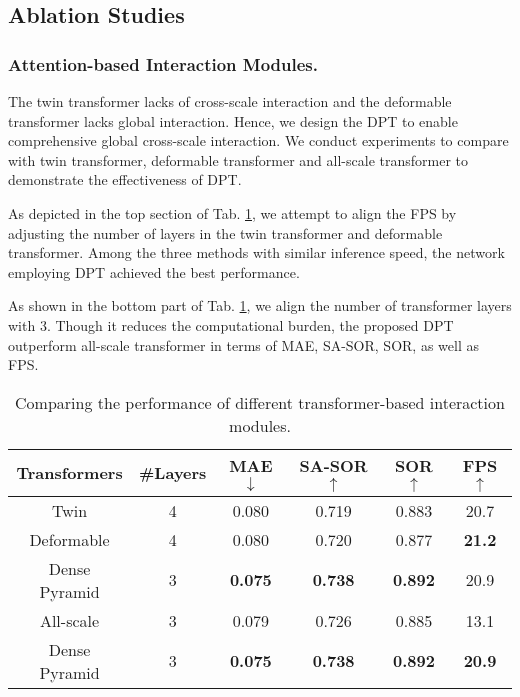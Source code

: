 \documentclass[sigconf]{acmart}
\newcommand{\tabref}[1]{Tab. \ref{#1}}
\begin{document}
\subsection{Ablation Studies}

\subsubsection{Attention-based Interaction Modules.} The twin transformer \cite{guo2021sotr} lacks of cross-scale interaction and the deformable transformer \cite{zhu2020deformable} lacks global interaction. Hence, we design the DPT to enable comprehensive global cross-scale interaction. We conduct experiments to compare with twin transformer, deformable transformer and all-scale transformer to demonstrate the effectiveness of DPT.

As depicted in the top section of \tabref{table:Ablation of attention}, we attempt to align the FPS by adjusting the number of layers in the twin transformer and deformable transformer. Among the three methods with similar inference speed, the network employing DPT achieved the best performance. 

As shown in the bottom part of \tabref{table:Ablation of attention}, we align the number of transformer layers with 3.
Though it reduces the computational burden, the proposed DPT outperform all-scale transformer in terms of MAE, SA-SOR, SOR, as well as FPS.

\begin{table}[t]
\caption{Comparing the performance of different transformer-based interaction modules.}
\label{table:Ablation of attention}
\setlength{\tabcolsep}{1.6mm}
    \begin{tabular}{c|c|c|c|c|c}
    \toprule[1pt]
    Transformers  & \#Layers & MAE$\downarrow$ & SA-SOR$\uparrow$ & SOR$\uparrow$    & FPS$\uparrow$  \\
    \hline
    Twin \cite{guo2021sotr}          & 4        & 0.080  & 0.719  & 0.883  & 20.7 \\
    Deformable \cite{zhu2020deformable}    & 4        & 0.080  & 0.720  & 0.877  & \textbf{21.2} \\
    Dense Pyramid & 3        & \textbf{0.075}  & \textbf{0.738}  & \textbf{0.892}  & 20.9 \\
    \hline
    \hline
    All-scale     & 3        & 0.079  & 0.726  & 0.885 & 13.1     \\
    Dense Pyramid & 3        & \textbf{0.075}  & \textbf{0.738}  & \textbf{0.892}  & \textbf{20.9} \\
    \bottomrule[1pt]
    \end{tabular}
\end{table}
\end{document}
